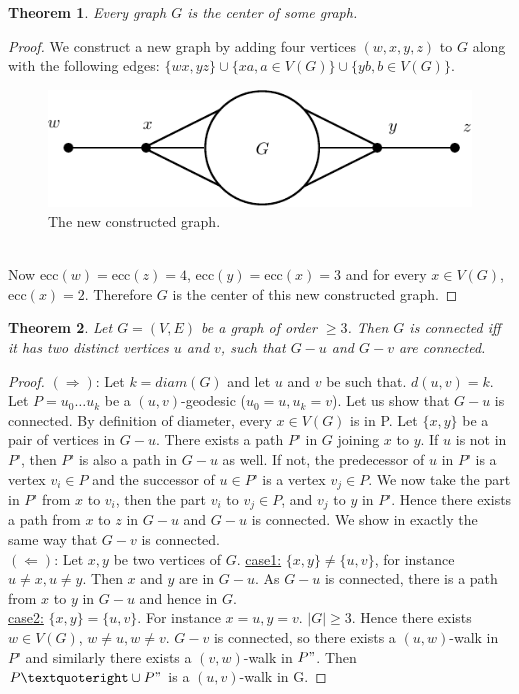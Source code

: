\documentclass[12pt,a4paper]{article}
\newtheorem{thm}{Theorem}[section]
\theoremstyle{definition}
\begin{document}
\newpage
\begin{thm} Every graph $G$ is the center of some graph. 
\end{thm}
\begin{proof}
We construct a new graph by adding four vertices $(w, x,y,z)$ to $G$ along with the following edges: $\{wx, yz\} \cup \{ xa, a \in V(G)\} \cup \{ yb, b \in V(G)\}.$ 
\begin{figure}[hbtp]
\centering
\includegraphics[scale=1]{images/graph24.pdf}
\caption{The new constructed graph.}
\end{figure}\\
Now ecc$(w)=$ecc$(z)=4$,  ecc$(y)=$ecc$(x)=3$ and for every $x \in V(G)$,  ecc$(x)=2$. Therefore $G$ is the center of this new constructed graph. 
\end{proof}
\begin{thm} \label{prevthm} Let $G=(V,E)$ be a graph of order $\geq 3$. Then $G$ is connected iff it has two distinct vertices $u$ and $v$, such that $G-u$ and $G-v$ are connected. 
\end{thm}
\begin{proof}
$(\Rightarrow)$: Let $k=diam(G)$ and let $u$ and $v$ be such that. $d(u,v)=k$. Let $P=u_0…u_k$ be a $(u,v)$-geodesic ($u_0=u, u_k=v$). Let us show that $G-u$ is connected. By definition of diameter, every $x \in V(G)$ is in P. Let $\{x,y\}$ be a pair of vertices in $G-u$. There exists a path $P’$ in $G$ joining $x$ to $y$. If $u$ is not in $P’$, then $P’$ is also a path in $G-u$ as well. If not, the predecessor of $u$ in $P’$ is a vertex $v_i \in P$ and the successor of $u \in P’$ is a vertex $v_j \in P$. We now take the part in $P’$ from $x$ to $v_i$, then the part $v_i$ to $v_j \in P$, and $v_j$ to $y$ in $P’$. Hence there exists a path from $x$ to $z$ in $G-u$ and $G-u$ is connected. We show in  exactly the same way that $G-v$ is connected.\\
$(\Leftarrow)$: Let $x,y$ be two vertices of $G$. 
\underline{case1:} $\{x,y\}\neq \{u,v\}$, for instance $u\neq x, u\neq y$. Then $x$ and $y$ are in $G-u$. As $G-u$ is connected, there is a path from $x$ to $y$ in $G-u$ and hence in $G$.\\
\underline{case2:} $\{x,y\}=\{u,v\}$. For instance $x=u, y=v$. $|G| \geq 3$. Hence there exists $w \in V(G)$, $w\neq u, w\neq v$. $G-v$ is connected, so there exists a  $(u,w)$-walk in $P’$ and similarly there exists a $(v,w)$-walk in $P"$. Then $P’ \cup P"$ is a $(u,v)$-walk in G.
\end{proof}
\end{document}

